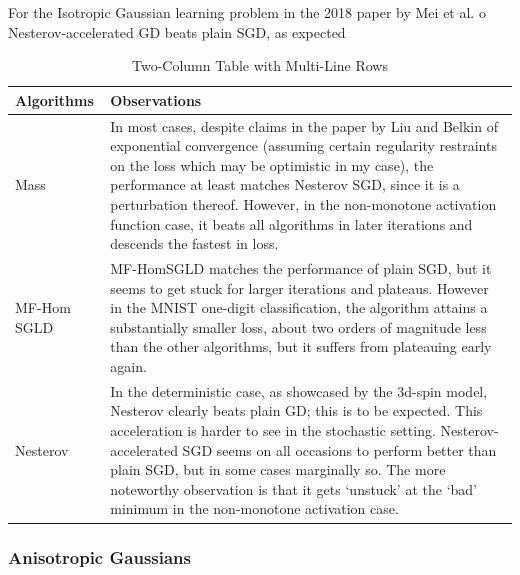 \documentclass{article}
\begin{document}
	For the Isotropic Gaussian learning problem in the 2018 paper by Mei et al.
o	Nesterov-accelerated GD beats plain SGD, as expected


\begin{table}[H]
\centering
\begin{tabular}{|p{7cm}|p{7cm}|} %
\hline
\textbf{Algorithms} & \textbf{Observations} \\
\hline\hline
Mass & In most cases, despite claims in the paper by Liu and Belkin \cite{liu2019acceleratingsgdmomentumoverparameterized} of exponential convergence (assuming certain regularity restraints on the loss which may be optimistic in my case), the performance at least matches Nesterov SGD, since it is a perturbation thereof. However, in the non-monotone activation function case, it beats all algorithms in later iterations and descends the fastest in loss.
\\
\hline
MF-Hom SGLD &MF-HomSGLD matches the performance of plain SGD, but it seems to get stuck for larger iterations and plateaus. However in the MNIST one-digit classification, the algorithm attains a substantially smaller loss, about two orders of magnitude less than the other algorithms, but it suffers from plateauing early again.
 \\
\hline
Nesterov & 	In the deterministic case, as showcased by the 3d-spin model, Nesterov clearly beats plain GD;  this is to be expected.
	This acceleration is harder to see in the stochastic setting. Nesterov-accelerated SGD seems on all occasions to perform better than plain SGD, but in some cases marginally so.
	The more noteworthy observation is that it gets ‘unstuck’ at the ‘bad’ minimum in the non-monotone activation case.
 \\
\hline
\end{tabular}
\caption{Two-Column Table with Multi-Line Rows}
\end{table}


\subsubsection{Anisotropic Gaussians}
\end{document}
